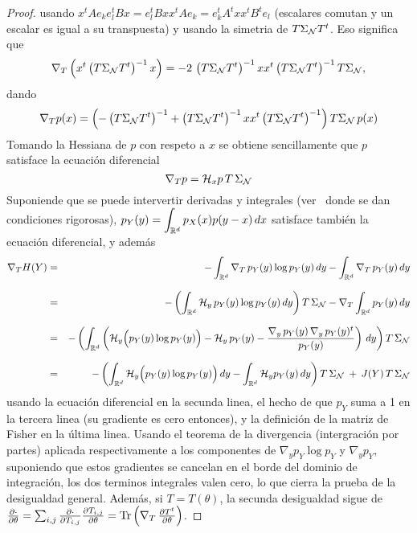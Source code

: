 \begin{proof}
  usando $x^t A e_k e_l^t  B x = e_l^t B x x^t A e_k =  e_k^t A^t x x^t B^t e_l$
  (escalares  comutan y  un  escalar es  igual  a su  transpuesta)  y usando  la
  simetria de  $T \Sigma_{\mathcal{N}} T^t$.   Eso significa que
  \[
  \nabla_T \left( x^t \left( T \Sigma_{\mathcal{N}} T^t \right)^{-1} x \right) = - 2 \,
  \left(  T \Sigma_{\mathcal{N}}  T^t \right)^{-1}  x  x^t \left(  T \Sigma_{\mathcal{N}}  T^t
  \right)^{-1} T \Sigma_{\mathcal{N}},
  \]
  dando
  \[
  \nabla_T p(x)  = \left( - \left(  T \Sigma_{\mathcal{N}} T^t \right)^{-1}  + \left( T
      \Sigma_{\mathcal{N}}  T^t   \right)^{-1}  x   x^t  \left(  T   \Sigma_{\mathcal{N}}  T^t
    \right)^{-1} \right) T \Sigma_{\mathcal{N}} \, p(x)
  \]
  Tomando la Hessiana de $p$ con  respeto a $x$ se obtiene sencillamente que $p$
  satisface  la  ecuaci\'on  diferencial
  \[
  \nabla_T p = \mathcal{H}_x p \, T \, \Sigma_{\mathcal{N}}
  \]
  Suponiende que  se puede intervertir derivadas  y integrales (ver~\cite{Bar84,
    Bar86}  donde  se  dan   condiciones  rigorosas),  $\displaystyle  p_Y(y)  =
  \int_{\mathbb{R}^d}  p_X(x)  p(y-x)  \,   dx$  satisface  tambi\'en  la  ecuaci\'on
  diferencial, y adem\'as
  \begin{eqnarray*}
  \nabla_T H(Y) & = & - \int_{\mathbb{R}^d} \nabla_T \, p_Y(y) \log p_Y(y)
  \, dy - \int_{\mathbb{R}^d} \nabla_T \, p_Y(y) \, dy\\[2.5mm]
  & = & - \left( \int_{\mathbb{R}^d} \mathcal{H}_y \, p_Y(y) \log p_Y(y) \, dy \right) T \,
  \Sigma_{\mathcal{N}} - \nabla_T \int_{\mathbb{R}^d} p_Y(y) \, dy\\[2.5mm]
  & = & - \left( \int_{\mathbb{R}^d} \left( \mathcal{H}_y \Big( p_Y(y) \log p_Y(y) \Big) -
  \mathcal{H}_y \, p_Y(y) - \frac{\nabla_y \, p_Y(y) \, \nabla_y \, p_Y(y)^t}{p_Y(y)}
  \right) \, dy \right) T \, \Sigma_{\mathcal{N}}\\[2.5mm]
  & = & - \left( \int_{\mathbb{R}^d} \mathcal{H}_y \Big( p_Y(y) \log p_Y(y) \Big) \, dy -
  \int_{\mathbb{R}^d} \mathcal{H}_y p_Y(y) \, dy \right) T \, \Sigma_{\mathcal{N}} \: + \: J(Y) \, T
  \, \Sigma_{\mathcal{N}}
  \end{eqnarray*}
  usando la  ecuaci\'on diferencial en la  secunda linea, el hecho  de que $p_Y$
  suma  a  1  en  la  tercera  linea  (su gradiente  es  cero  entonces),  y  la
  definici\'on de la matriz de Fisher en la \'ultima linea. Usando el teorema de
  la  divergencia (intergraci\'on  por  partes) aplicada  respectivamente a  los
  componentes de $\nabla_y p_Y \log  p_Y$ y $\nabla_y p_Y$, suponiendo que estos
  gradientes  se cancelan  en el  borde del  dominio de  integraci\'on,  los dos
  terminos  integrales valen cero,  lo que  cierra la  prueba de  la desigualdad
  general.   Adem\'as,  si  $T  =  T(\theta)$, la  secunda  desigualdad  sigue  de
  $\frac{\partial   \cdot}{\partial    \theta}   =   \sum_{i,j}   \frac{\partial
    \cdot}{\partial   T_{i,j}}   \frac{\partial   T_{i,j}}{\partial  \theta}   =
  \operatorname{Tr}\left( \nabla_T \, \frac{\partial T^t}{\partial \theta} \right)$.
\end{proof}


